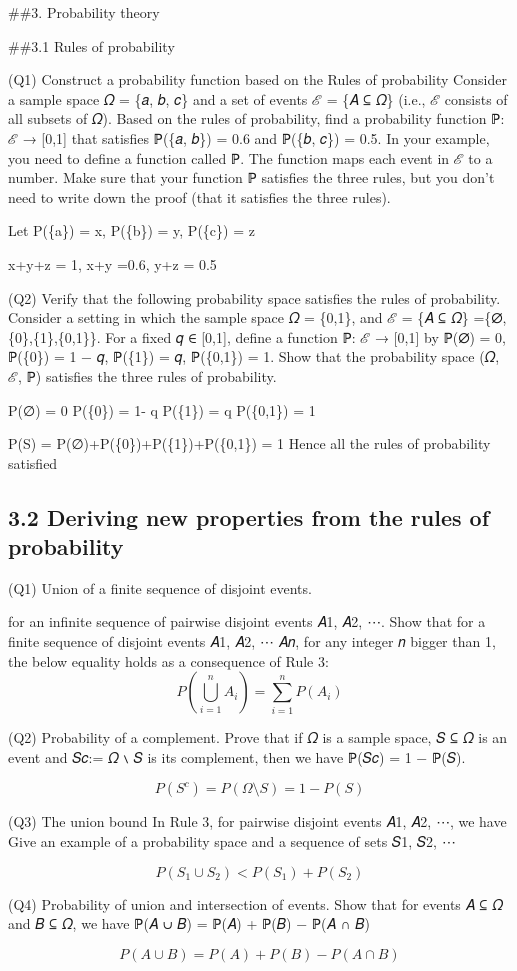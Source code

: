\documentclass[
]{article}
\begin{document}
\#\#3. Probability theory

\#\#3.1 Rules of probability

(Q1) Construct a probability function based on the Rules of probability
Consider a sample space 𝛺 = \{𝑎, 𝑏, 𝑐\} and a set of events ℰ = \{𝐴 ⊆
𝛺\} (i.e., ℰ consists of all subsets of 𝛺). Based on the rules of
probability, find a probability function ℙ: ℰ → {[}0,1{]} that satisfies
ℙ(\{𝑎, 𝑏\}) = 0.6 and ℙ(\{𝑏, 𝑐\}) = 0.5. In your example, you need to
define a function called ℙ. The function maps each event in ℰ to a
number. Make sure that your function ℙ satisfies the three rules, but
you don't need to write down the proof (that it satisfies the three
rules).

Let P(\{a\}) = x, P(\{b\}) = y, P(\{c\}) = z

x+y+z = 1, x+y =0.6, y+z = 0.5

(Q2) Verify that the following probability space satisfies the rules of
probability. Consider a setting in which the sample space 𝛺 = \{0,1\},
and ℰ = \{𝐴 ⊆ 𝛺\} =\{∅,\{0\},\{1\},\{0,1\}\}. For a fixed 𝑞 ∈ {[}0,1{]},
define a function ℙ: ℰ → {[}0,1{]} by ℙ(∅) = 0, ℙ(\{0\}) = 1 − 𝑞,
ℙ(\{1\}) = 𝑞, ℙ(\{0,1\}) = 1. Show that the probability space (𝛺, ℰ, ℙ)
satisfies the three rules of probability.

P(∅) = 0 P(\{0\}) = 1- q P(\{1\}) = q P(\{0,1\}) = 1

P(S) = P(∅)+P(\{0\})+P(\{1\})+P(\{0,1\}) = 1 Hence all the rules of
probability satisfied

\subsection{3.2 Deriving new properties from the rules of
probability}\label{deriving-new-properties-from-the-rules-of-probability}

(Q1) Union of a finite sequence of disjoint events.

for an infinite sequence of pairwise disjoint events 𝐴1, 𝐴2, ⋯. Show
that for a finite sequence of disjoint events 𝐴1, 𝐴2, ⋯ 𝐴𝑛, for any
integer 𝑛 bigger than 1, the below equality holds as a consequence of
Rule 3: \[
P\left(\bigcup_{i=1}^{n} A_i\right) = \sum_{i=1}^{n} P(A_i)
\]

(Q2) Probability of a complement. Prove that if 𝛺 is a sample space, 𝑆 ⊆
𝛺 is an event and 𝑆𝑐:= 𝛺 ∖ 𝑆 is its complement, then we have ℙ(𝑆𝑐) = 1 −
ℙ(𝑆).

\[
P(S^c) = P(\Omega \setminus S) = 1 - P(S)
\]

(Q3) The union bound In Rule 3, for pairwise disjoint events 𝐴1, 𝐴2, ⋯,
we have Give an example of a probability space and a sequence of sets
𝑆1, 𝑆2, ⋯

\[
P(S_1 \cup S_2) < P(S_1) + P(S_2)
\]

(Q4) Probability of union and intersection of events. Show that for
events 𝐴 ⊆ 𝛺 and 𝐵 ⊆ 𝛺, we have ℙ(𝐴 ∪ 𝐵) = ℙ(𝐴) + ℙ(𝐵) − ℙ(𝐴 ∩ 𝐵)

\[
P(A \cup B) = P(A) + P(B) - P(A \cap B)
\]
\end{document}

